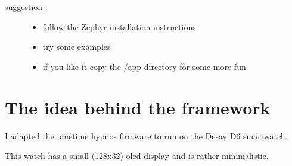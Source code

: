 \documentclass[letterpaper,10pt,english]{sphinxmanual}
\begin{document}
\begin{sphinxVerbatim}[commandchars=\\\{\}]
          
       
        
          


     
           

          
       
\end{sphinxVerbatim}
\begin{description}
\item[{suggestion :}] \leavevmode\begin{itemize}
\item {} 
follow the Zephyr installation instructions

\item {} 
try some examples

\item {} 
if you like it copy the /app directory for some more fun

\end{itemize}

\end{description}

\noindent{}


\chapter{The idea behind the framework}
\label{\detokenize{idea:the-idea-behind-the-framework}}\label{\detokenize{idea::doc}}
I adapted the pinetime hypnos firmware to run on the Desay D6 smartwatch.

This watch has a small (128x32) oled display and is rather minimalistic.
\end{document}

